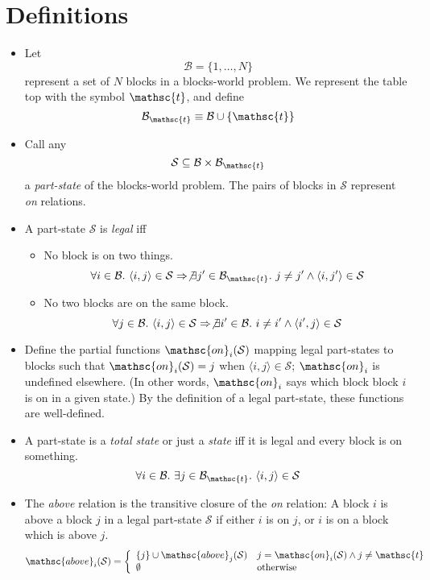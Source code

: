 \documentclass{article}
\newcommand{\implies}{\Rightarrow}
\newcommand{\have}{{.~}}
\newcommand{\bstate}{{\mathcal{S}}}
\newcommand{\blocks}{{\mathcal{B}}}
\newcommand{\tabtop}{{\mathsc{t}}}
\newcommand{\tblocks}{{\blocks_\tabtop}}
\newcommand{\bon}{{\mathsc{on}}}
\newcommand{\babove}{{\mathsc{above}}}
\begin{document}
\section{Definitions}

\begin{itemize}
\item Let
  $$ \blocks = \{ 1, \ldots, N \} $$
represent a set of $N$ blocks in a blocks-world problem.
We represent the table top with the symbol $\tabtop$, and
define $$ \tblocks \equiv \blocks \cup \{ \tabtop \} $$
  
\item Call any 
  $$ \bstate \subseteq \blocks \times \tblocks $$
a {\em part-state} of the blocks-world problem. The pairs of blocks in
$\bstate$ represent {\em on} relations.

\item A part-state $\bstate$ is {\em legal} iff
  \begin{itemize}
  \item No block is on two things. $$
    \forall i \in \blocks \have
      \langle i , j \rangle \in \bstate \implies
      \not\exists j' \in \tblocks \have
	j \neq j' \wedge \langle i , j' \rangle \in \bstate
  $$
  \item No two blocks are on the same block. $$
    \forall j \in \blocks \have
      \langle i , j \rangle \in \bstate \implies
      \not\exists i' \in \blocks \have
	i \neq i' \wedge \langle i' , j \rangle \in \bstate
  $$
  \end{itemize}

\item Define the partial functions
$\bon_i(\bstate)$ mapping legal part-states to
blocks such that
$\bon_i(\bstate) = j$ when $\langle i, j \rangle \in \bstate$;
$\bon_i$ is undefined elsewhere.
(In other words, $\bon_i$ says
which block block $i$ is on in a given state.)
By the definition of a legal part-state, these functions are well-defined.

\item A part-state is a {\em total state} or just a {\em state}
iff it is legal and every block is on something. $$
    \forall i \in \blocks \have
      \exists j \in \tblocks \have
	\langle i , j \rangle \in \bstate
$$

\item The {\em above} relation is the transitive closure of
the {\em on} relation: A block $i$ is above a block $j$ in a
legal part-state $\bstate$ if either $i$ is on $j$, or $i$ is on
a block which is above $j$.  $$
  \babove_i(\bstate) = \left \{ \begin{array}{ll}
    \{ j \} \cup \babove_j(\bstate) &
      j = \bon_i(\bstate) \wedge j \neq \tabtop \\
    \emptyset & \mbox{otherwise}
  \end{array} \right .
$$


\end{itemize}
\end{document}
